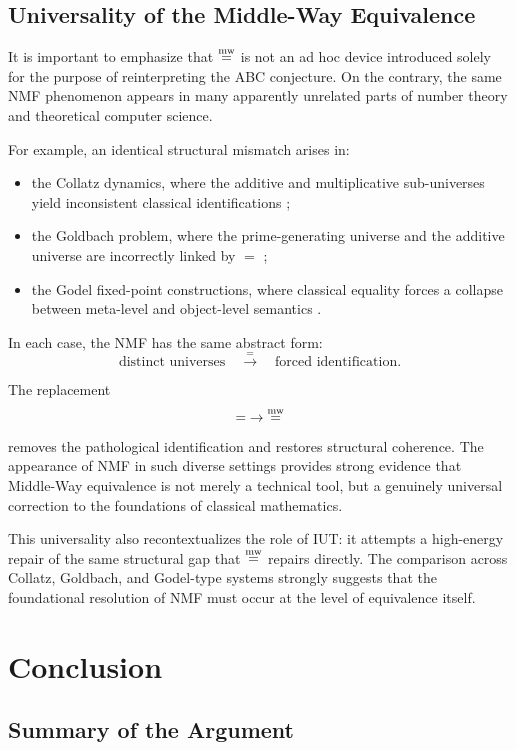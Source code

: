 \documentclass[11pt]{article}
\begin{document}
\subsection{Universality of the Middle-Way Equivalence}

It is important to emphasize that $\mathrel{\overset{\mathrm{mw}}{=}}$ is not an ad hoc device
introduced solely for the purpose of reinterpreting the ABC conjecture.
On the contrary, the same NMF phenomenon appears in many apparently
unrelated parts of number theory and theoretical computer science.

For example, an identical structural mismatch arises in:
\begin{itemize}
\item the Collatz dynamics, where the additive and multiplicative
      sub-universes yield inconsistent classical identifications
      \cite{Chiba2025Collatz};
\item the Goldbach problem, where the prime-generating universe and the
      additive universe are incorrectly linked by $=$
      \cite{Chiba2025Goldbach};
\item the Godel fixed-point constructions, where classical equality
      forces a collapse between meta-level and object-level semantics
      \cite{Chiba2025Godel}.
\end{itemize}

In each case, the NMF has the same abstract form:
\[
\text{distinct universes} \quad
\overset{=}{\longrightarrow} \quad
\text{forced identification}.
\]

The replacement
\[
= \;\to\; \mathrel{\overset{\mathrm{mw}}{=}}
\]
removes the pathological identification and restores structural
coherence.  The appearance of NMF in such diverse settings provides
strong evidence that Middle-Way equivalence is not merely a technical
tool, but a genuinely universal correction to the foundations of
classical mathematics.

This universality also recontextualizes the role of IUT: it attempts a
high-energy repair of the same structural gap that $\mathrel{\overset{\mathrm{mw}}{=}}$ repairs
directly.  The comparison across Collatz, Goldbach, and Godel-type
systems strongly suggests that the foundational resolution of NMF must
occur at the level of equivalence itself.



\section{Conclusion}

\subsection{Summary of the Argument}
\end{document}
